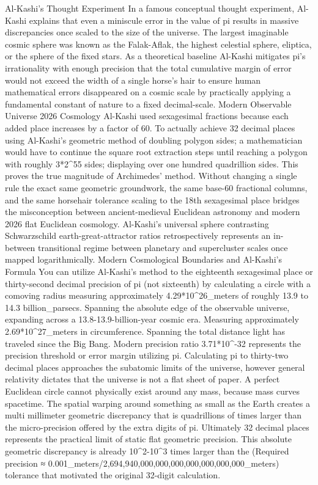 {Al-Kashi’s Thought Experiment
In a famous conceptual thought experiment, Al-Kashi explains that even a miniscule error in the value of pi results in massive discrepancies once scaled to the size of the universe. The largest imaginable cosmic sphere was known as the Falak-Aflak, the highest celestial sphere, eliptica, or the sphere of the fixed stars. As a theoretical baseline Al-Kashi mitigates pi’s irrationality with enough precision that the total cumulative margin of error would not exceed the width of a single horse’s hair to ensure human mathematical errors disappeared on a cosmic scale by practically applying a fundamental constant of nature to a fixed decimal-scale.
Modern Observable Universe 2026 Cosmology
Al-Kashi used sexagesimal fractions because each added place increases by a factor of 60. To actually achieve 32 decimal places using Al-Kashi’s geometric method of doubling polygon sides; a mathematician would have to continue the square root extraction steps until reaching a polygon with roughly 3*2^55 sides; displaying over one hundred quadrillion sides. This proves the true magnitude of Archimedes’ method. Without changing a single rule the exact same geometric groundwork, the same base-60 fractional columns, and the same horsehair tolerance scaling to the 18th sexagesimal place bridges the misconception between ancient-medieval Euclidean astronomy and modern 2026 flat Euclidean cosmology. Al-Kashi’s universal sphere contrasting Schwarzschild earth-great-attractor ratios retrospectively represents an in-between transitional regime between planetary and supercluster scales once mapped logarithmically. 
Modern Cosmological Boundaries and Al-Kashi’s Formula
You can utilize Al-Kashi’s method to the eighteenth sexagesimal place or thirty-second decimal precision of pi (not sixteenth) by calculating a circle with a comoving radius measuring approximately 4.29*10^26_meters of roughly 13.9 to 14.3 billion_parsecs. Spanning the absolute edge of the observable universe, expanding across a 13.8-13.9-billion-year cosmic era. Measuring approximately 2.69*10^27_meters in circumference. Spanning the total distance light has traveled since the Big Bang. Modern precision ratio  3.71*10^-32 represents the precision threshold or error margin utilizing pi. Calculating pi to thirty-two decimal places approaches the subatomic limits of the universe, however general relativity dictates that the universe is not a flat sheet of paper. 
A perfect Euclidean circle cannot physically exist around any mass, because mass curves spacetime. The spatial warping around something as small as the Earth creates a multi millimeter geometric discrepancy that is quadrillions of times larger than the micro-precision offered by the extra digits of pi. Ultimately 32 decimal places represents the practical limit of static flat geometric precision. This absolute geometric discrepancy is already 10^2-10^3 times larger than the (Required precision ≈ 0.001_meters/2,694,940,000,000,000,000,000,000,000_meters) tolerance that motivated the original 32-digit calculation. 
}
